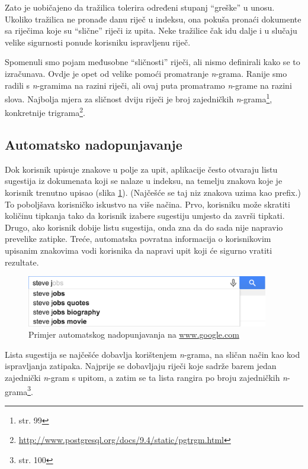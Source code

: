 \documentclass[a4paper,twoside,12pt]{scrreprt}
\begin{document}
Zato je uobičajeno da tražilica tolerira određeni stupanj ``greške'' u unosu. Ukoliko tražilica ne pronađe danu riječ u indeksu, ona pokuša pronaći dokumente sa riječima koje su ``slične'' riječi iz upita. Neke tražilice čak idu dalje i u slučaju velike sigurnosti ponude korisniku ispravljenu riječ.

Spomenuli smo pojam međusobne ``sličnosti'' riječi, ali nismo definirali kako se to izračunava. Ovdje je opet od velike pomoći promatranje \textit{n}-grama. Ranije smo radili s \textit{n}-gramima na razini riječi, ali ovaj puta promatramo \textit{n}-grame na razini slova. Najbolja mjera za sličnost dviju riječi je broj zajedničkih \textit{n}-grama\footnote{\cite{taming} str. 99}, konkretnije trigrama\footnote{\url{http://www.postgresql.org/docs/9.4/static/pgtrgm.html}}.

\subsection{Automatsko nadopunjavanje}

Dok korisnik upisuje znakove u polje za upit, aplikacije često otvaraju listu sugestija iz dokumenata koji se nalaze u indeksu, na temelju znakova koje je korisnik trenutno upisao (slika \ref{typeahead}). (Najčešće se taj niz znakova uzima kao prefix.) To poboljšava korisničko iskustvo na više načina. Prvo, korisniku može skratiti količinu tipkanja tako da korisnik izabere sugestiju umjesto da završi tipkati. Drugo, ako korisnik dobije listu sugestija, onda zna da do sada nije napravio prevelike zatipke. Treće, automatska povratna informacija o korisnikovim upisanim znakovima vodi korisnika da napravi upit koji će sigurno vratiti rezultate.

\begin{figure}[H]
  \centering
  \includegraphics[width=300pt]{typeahead}
  \caption{Primjer automatskog nadopunjavanja na \url{www.google.com}}
  \label{typeahead}
\end{figure}

Lista sugestija se najčešće dobavlja korištenjem \textit{n}-grama, na sličan način kao kod ispravljanja zatipaka. Najprije se dobavljaju riječi koje sadrže barem jedan zajednički \textit{n}-gram s upitom, a zatim se ta lista rangira po broju zajedničkih \textit{n}-grama\footnote{\cite{taming} str. 100}.
\end{document}

